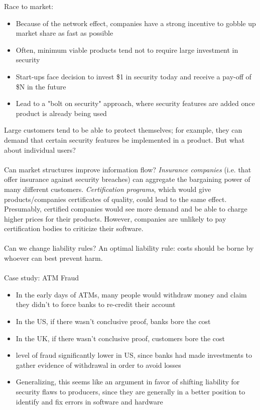 Race to market:
	\begin{itemize}
		\item Because of the network effect, companies have a strong incentive to gobble up market share as fast as possible
		\item Often, minimum viable products tend not to require large investment in security
		\item Start-ups face decision to invest \$1 in security today and receive a pay-off of \$N in the future
		\item Lead to a "bolt on security" approach, where security features are added once product is already being used
	\end{itemize}
	
Large customers tend to be able to protect themselves; for example, they can demand that certain security features be implemented in a product. But what about individual users?
\\
\\
Can market structures improve information flow? \emph{Insurance companies} (i.e. that offer insurance against security breaches) can aggregate the bargaining power of many different customers. \emph{Certification programs}, which would give products/companies certificates of quality, could lead to the same effect. Presumably, certified companies would see more demand and be able to charge higher prices for their products. However, companies are unlikely to pay certification bodies to criticize their software. 
\\
\\
Can we change liability rules? An optimal liability rule: costs should be borne by whoever can best prevent harm. 
\\
\\ Case study: ATM Fraud
	\begin{itemize}
		\item In the early days of ATMs, many people would withdraw money and claim they didn't to force banks to re-credit their account
		\item In the US, if there wasn't conclusive proof, banks bore the cost
		\item In the UK, if there wasn't conclusive proof, customers bore the cost
		\item level of fraud significantly lower in US, since banks had made investments to gather evidence of withdrawal in order to avoid losses
		\item Generalizing, this seems like an argument in favor of shifting liability for security flaws to producers, since they are generally in a better position to identify and fix errors in software and hardware
	\end{itemize}

